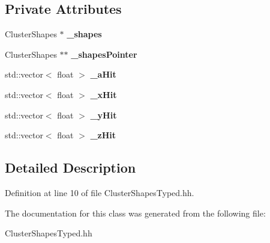\subsection*{Private Attributes}
\begin{DoxyCompactItemize}
\item 
ClusterShapes $\ast$ {\bfseries \_\-shapes}\label{classCALICE_1_1ClusterShapesTyped_abefd2921e7b46295049038249a341e0c}

\item 
ClusterShapes $\ast$$\ast$ {\bfseries \_\-shapesPointer}\label{classCALICE_1_1ClusterShapesTyped_ab876f0147f6c5637461214d6373ba5ab}

\item 
std::vector$<$ float $>$ {\bfseries \_\-aHit}\label{classCALICE_1_1ClusterShapesTyped_aa04563ae806937cc66e2ea67c7793449}

\item 
std::vector$<$ float $>$ {\bfseries \_\-xHit}\label{classCALICE_1_1ClusterShapesTyped_a4392fd32a786c63115624cb82218c509}

\item 
std::vector$<$ float $>$ {\bfseries \_\-yHit}\label{classCALICE_1_1ClusterShapesTyped_ac7e0b672703cd19d2327a774d2472bf7}

\item 
std::vector$<$ float $>$ {\bfseries \_\-zHit}\label{classCALICE_1_1ClusterShapesTyped_acd58104f72c22a4d34b3455c17fc361c}

\end{DoxyCompactItemize}


\subsection{Detailed Description}


Definition at line 10 of file ClusterShapesTyped.hh.

The documentation for this class was generated from the following file:\begin{DoxyCompactItemize}
\item 
ClusterShapesTyped.hh\end{DoxyCompactItemize}
